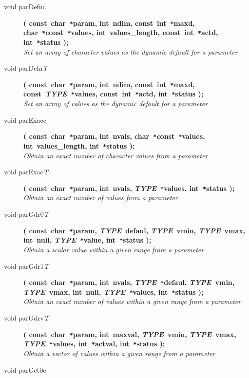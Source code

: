 \documentclass[twoside,11pt]{article}
\begin{document}
\begin{flushleft}
\begin{description}
\item[void parDefnc]
\textbf{( const~char~\texttt{*}param, int~ndim, const~int~\texttt{*}maxd,
               char~\texttt{*}const~\texttt{*}values, int~values\_length, const~int~\texttt{*}actd, 
               int~\texttt{*}status );} \\
\textit{Set an array of character values as the dynamic default for a parameter}
\item[void parDefn\textit{T}]
\textbf{( const~char~\texttt{*}param, int~ndim, const~int~\texttt{*}maxd, 
               const~\textit{TYPE}~\texttt{*}values, const~int~\texttt{*}actd,
               int~\texttt{*}status );} \\
\textit{Set an array of values as the dynamic default for a parameter}
\item[void parExacc]
\textbf{( const~char~\texttt{*}param, int~nvals, char~\texttt{*}const~\texttt{*}values, 
               int~values\_length, int~\texttt{*}status );} \\
\textit{Obtain an exact number of character values from a parameter}
\item[void parExac\textit{T}]
\textbf{( const~char~\texttt{*}param, int~nvals, \textit{TYPE}~\texttt{*}values, int~\texttt{*}status );}\\
\textit{Obtain an exact number of values from a parameter}
\item[void parGdr0\textit{T}]
\textbf{( const~char~\texttt{*}param, \textit{TYPE}~defaul, \textit{TYPE}~vmin,
               \textit{TYPE}~vmax, int~null, \textit{TYPE}~\texttt{*}value,
               int~\texttt{*}status );} \\
\textit{Obtain a scalar value within a given range from a parameter}
\item[void parGdr1\textit{T}]
\textbf{( const~char~\texttt{*}param, int~nvals, 
               \textit{TYPE}~\texttt{*}defaul, \textit{TYPE}~vmin,
               \textit{TYPE}~vmax, int~null, \textit{TYPE}~\texttt{*}values,
               int~\texttt{*}status );} \\
\textit{Obtain an exact number of values within a given range from a parameter}
\item[void parGdrv\textit{T}]
\textbf{( const~char~\texttt{*}param, int~maxval, \textit{TYPE}~vmin, 
               \textit{TYPE}~vmax, \textit{TYPE}~\texttt{*}values,
               int~\texttt{*}actval, int~\texttt{*}status );} \\
\textit{Obtain a vector of values within a given range from a parameter}
\item[void parGet0c]

\end{description}
\end{flushleft}
\end{document}
